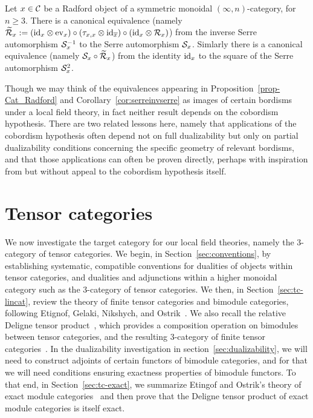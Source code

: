 \documentclass{amsart}
\begin{document}
\begin{corollary}\label{cor:serreinvserre}
Let $x \in \mathcal C$ be a Radford object of a symmetric monoidal $(\infty,n)$-category, for $n \geq 3$.  There is a canonical equivalence (namely $\widetilde{\mathcal R}_x := (\mathrm{id}_{x} \otimes \mathrm{ev}_{x}) \circ (\tau_{x, x} \otimes \mathrm{id}_{\overline{x}}) \circ (\mathrm{id}_{x} \otimes \mathcal R_x)$) from the inverse Serre automorphism $\mathcal S_x^{-1}$ to the Serre automorphism $\mathcal S_x$.  Simlarly there is a canonical equivalence (namely $\mathcal S_x \circ \widetilde{\mathcal R}_x$) from the identity $\mathrm{id}_x$ to the square of the Serre automorphism $\mathcal S_x^2$.
\end{corollary}

Though we may think of the equivalences appearing in Proposition~\ref{prop-Cat_Radford} and Corollary~\ref{cor:serreinvserre} as images of certain bordisms under a local field theory, in fact neither result depends on the cobordism hypothesis.  There are two related lessons here, namely that applications of the cobordism hypothesis often depend not on full dualizability but only on partial dualizability conditions concerning the specific geometry of relevant bordisms, and that those applications can often be proven directly, perhaps with inspiration from but without appeal to the cobordism hypothesis itself.



\section{Tensor categories} \label{sec:tc}


We now investigate the target category for our local field theories, namely the 3-category of tensor categories.  We begin, in Section~\ref{sec:conventions}, by establishing systematic, compatible conventions for dualities of objects within tensor categories, and dualities and adjunctions within a higher monoidal category such as the 3-category of tensor categories.  We then, in Section~\ref{sec:tc-lincat}, review the theory of finite tensor categories and bimodule categories, following Etignof, Gelaki, Nikshych, and Ostrik~\cite{MR1976459,MR2183279,MR2097289, 0909.3140, EGNO}.  We also recall the relative Deligne tensor product~\cite{BTP}, which provides a composition operation on bimodules between tensor categories, and the resulting 3-category of finite tensor categories~\cite{3TC}.  In the dualizability investigation in section~\ref{sec:dualizability}, we will need to construct adjoints of certain functors of bimodule categories, and for that we will need conditions ensuring exactness properties of bimodule functors.  To that end, in Section~\ref{sec:tc-exact}, we summarize Etingof and Ostrik's theory of exact module categories~\cite{EO-ftc} and then prove that the Deligne tensor product of exact module categories is itself exact.  
\end{document}

